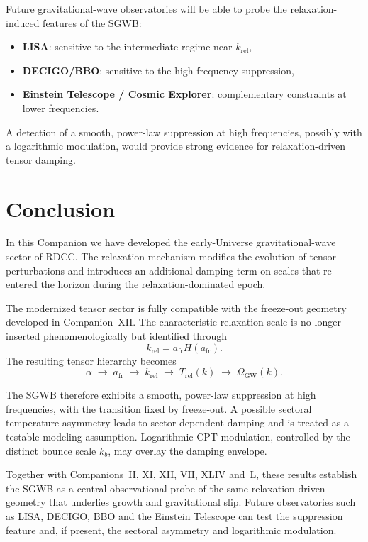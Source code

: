\documentclass[11pt,a4paper]{article}
\begin{document}
Future gravitational-wave observatories will be able to probe the
relaxation-induced features of the SGWB:
\begin{itemize}
  \item \textbf{LISA}: sensitive to the intermediate regime near
        \(k_{\mathrm{rel}}\),
  \item \textbf{DECIGO/BBO}: sensitive to the high-frequency suppression,
  \item \textbf{Einstein Telescope / Cosmic Explorer}: complementary
        constraints at lower frequencies.
\end{itemize}
A detection of a smooth, power-law suppression at high frequencies,
possibly with a logarithmic modulation, would provide strong evidence for
relaxation-driven tensor damping.

\section{Conclusion}

In this Companion we have developed the early-Universe gravitational-wave
sector of RDCC. The relaxation mechanism modifies the evolution of tensor
perturbations and introduces an additional damping term on scales that
re-entered the horizon during the relaxation-dominated epoch.

The modernized tensor sector is fully compatible with the freeze-out
geometry developed in Companion~XII. The characteristic relaxation scale
is no longer inserted phenomenologically but identified through
\begin{equation}
  k_{\mathrm{rel}}
  =
  a_{\mathrm{fr}} H(a_{\mathrm{fr}}).
\end{equation}
The resulting tensor hierarchy becomes
\begin{equation}
  \alpha
  \;\rightarrow\;
  a_{\mathrm{fr}}
  \;\rightarrow\;
  k_{\mathrm{rel}}
  \;\rightarrow\;
  T_{\mathrm{rel}}(k)
  \;\rightarrow\;
  \Omega_{\mathrm{GW}}(k).
\end{equation}

The SGWB therefore exhibits a smooth, power-law suppression at high
frequencies, with the transition fixed by freeze-out. A possible sectoral
temperature asymmetry leads to sector-dependent damping and is treated as
a testable modeling assumption. Logarithmic CPT modulation, controlled by
the distinct bounce scale \(k_{b}\), may overlay the damping envelope.

Together with Companions~II, XI, XII, VII, XLIV and~L, these results
establish the SGWB as a central observational probe of the same
relaxation-driven geometry that underlies growth and gravitational slip.
Future observatories such as LISA, DECIGO, BBO and the Einstein Telescope
can test the suppression feature and, if present, the sectoral asymmetry
and logarithmic modulation.
\end{document}

